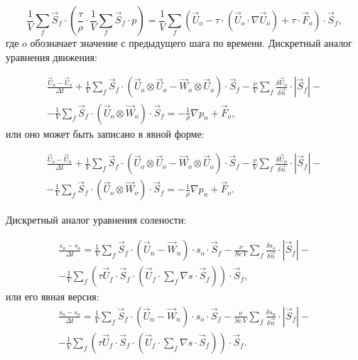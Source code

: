 \begin{equation}
        \frac{1}{V} \sum_f \vec{S}_f \cdot \left(   \frac{\tau}{\rho} \cdot \frac{1}{V} \sum_f \vec{S}_f \cdot p  \right) = \frac{1}{V} \sum_f \left( \vec{U}_o - \tau \cdot (\vec{U}_o \cdot \nabla \vec{U}_o ) + \tau \cdot \vec{F}_o \right) \cdot \vec{S}_f,
        \label{eq:Poisson}
\end{equation}
где $o$ обозначает значение с предыдущего шага по времени.
Дискретный аналог уравнения движения:   

\begin{multline}
    \frac{ \vec{U}_n-\vec{U}_o}{\Delta t} + \frac{1}{V} \sum_f \vec{S}_f \cdot \left( \vec{U}_o \otimes \vec{U}_o - \vec{W}_o \otimes \vec{U}_o \right) \cdot \vec{S}_f - \frac{\nu}{V} \sum_f \frac{\delta\vec{U}_o}{\delta \vec{n}}\cdot |\vec{S}_f| - \\
    - \frac{1}{V} \sum_f \vec{S}_f \cdot \left( \vec{U}_o \otimes \vec{W}_o \right) \cdot \vec{S}_f = - \frac{1}{\rho} \nabla p_n + \vec{F}_o,
    \label{eq:momentumImpl}
\end{multline}
или оно может быть записано в явной форме:

\begin{multline}
    \frac{ \vec{U}_o-\vec{U}_n}{\Delta t} + \frac{1}{V} \sum_f \vec{S}_f \cdot \left( \vec{U}_o \otimes \vec{U}_o - \vec{W}_o \otimes \vec{U}_o \right) \cdot \vec{S}_f - \frac{\nu}{V} \sum_f \frac{\delta\vec{U}_n}{\delta \vec{n}}\cdot |\vec{S}_f| - \\
    - \frac{1}{V} \sum_f \vec{S}_f \cdot \left( \vec{U}_o \otimes \vec{W}_o \right) \cdot \vec{S}_f = - \frac{1}{\rho} \nabla p_n + \vec{F}_o.
    \label{eq:momentumExp}
\end{multline}

Дискретный аналог уравнения солености:

\begin{multline}
    \frac{ s_n-s_o}{\Delta t} = \frac{1}{V}\sum_f \vec{S}_f \cdot \left (\vec{U}_n - \vec{W}_n \right) \cdot s_o \cdot \vec{S}_f - \frac{\nu}{Sc \, V} \sum_f \frac{\delta s_o}{\delta \vec{n}}\cdot |\vec{S}_f| -\\
    - \frac{1}{V} \sum_f \left( \tau \vec{U}_f \cdot \vec{S}_f \cdot (\vec{U}_f \cdot \sum_f \nabla s \cdot \vec{S}_f)\right) \cdot \vec{S}_f,    
    \label{eq:salImp}
\end{multline}
или его явная версия:
\begin{multline}
    \frac{ s_n-s_o}{\Delta t} = \frac{1}{V}\sum_f \vec{S}_f \cdot \left (\vec{U}_n - \vec{W}_n \right) \cdot s_o \cdot \vec{S}_f - \frac{\nu}{Sc \, V} \sum_f \frac{\delta s_n}{\delta \vec{n}}\cdot |\vec{S}_f| -\\
    - \frac{1}{V} \sum_f \left( \tau \vec{U}_f \cdot \vec{S}_f \cdot (\vec{U}_f \cdot \sum_f \nabla s \cdot \vec{S}_f)\right) \cdot \vec{S}_f.  
    \label{eq:salExp}
\end{multline}

